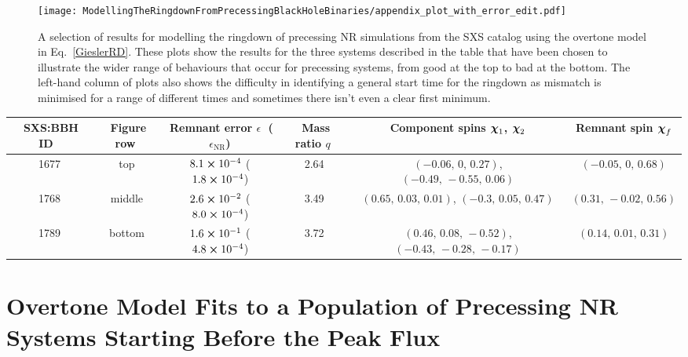 \begin{figure}[h]
    \centering
    \texttt{[image: ModellingTheRingdownFromPrecessingBlackHoleBinaries/appendix\_plot\_with\_error\_edit.pdf]}
    \caption[Selection of results for modelling the ringdown of misaligned-spin SXS simulations using the overtone model]{ 
    A selection of results for modelling the ringdown of precessing NR simulations from the SXS catalog \cite{Boyle:2019kee, Mroue:2013xna,sxs_catalog} using the overtone model in Eq.~\ref{GieslerRD}.
    These plots show the results for the three systems described in the table that have been chosen to illustrate the wider range of behaviours that occur for precessing systems, from good at the top to bad at the bottom.
    The left-hand column of plots also shows the difficulty in identifying a general start time for the ringdown as mismatch is minimised for a range of different times and sometimes there isn't even a clear first minimum.
    }
	\label{misaligned_spin_variation}
\end{figure}

\begin{footnotesize}
\begin{center}
\begin{tabular}{ c|c|c|c|c|c } 
$\;$SXS:BBH ID $\;$ & $\;$Figure row$\;$ & $\;$Remnant error $\epsilon$$\;$ ($\epsilon_{\mathrm{NR}}$) &  $\;$Mass ratio $q$$\;$ & Component spins $\vb*{\chi}_1$, $\vb*{\chi}_2$  & $\;$Remnant spin $\vb*{\chi}_f$$\;$ \\
\hline
1677 & top & $8.1 \cross 10^{-4}$ ($1.8 \cross 10^{-4}$) & 2.64 & $(-0.06,\,0,\,0.27)$, $(-0.49,\,-0.55,\,0.06)$ & $(-0.05,\,0,\,0.68)$ \\ 
1768 & middle & $2.6 \cross 10^{-2}$ ($8.0 \cross 10^{-4}$) & 3.49 & $(0.65,\,0.03,\,0.01)$, $(-0.3,\,0.05,\,0.47)$ & $(0.31,\,-0.02,\,0.56)$ \\ 
1789 & bottom & $1.6 \cross 10^{-1}$ ($4.8 \cross 10^{-4}$) & 3.72 & $(0.46,\,0.08,\,-0.52)$, $(-0.43,\,-0.28,\,-0.17)$ & $(0.14,\,0.01,\,0.31)$ \\ 
\end{tabular}
\end{center}
\end{footnotesize}


\section{Overtone Model Fits to a Population of Precessing NR Systems Starting Before the Peak Flux}\label{misaligned_spin_fits_appendix}

